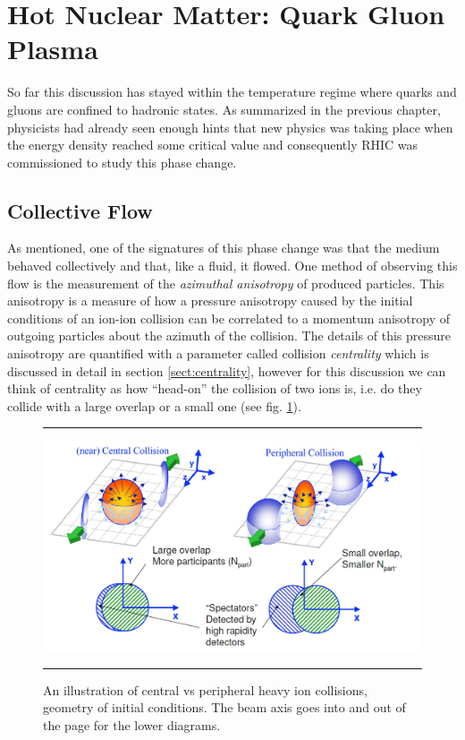 \section{Hot Nuclear Matter: Quark Gluon Plasma }
So far this discussion has stayed within the temperature regime where quarks and gluons are confined to hadronic states. As summarized in the previous chapter, physicists had already seen enough hints that new physics was taking place when the energy density reached some critical value and consequently RHIC was commissioned to study this phase change.

\subsection{Collective Flow}
As mentioned, one of the signatures of this phase change was that the medium behaved collectively and that, like a fluid, it flowed. One method of observing this flow is the measurement of the \textit{azimuthal anisotropy} of produced particles. This anisotropy is a measure of how a pressure anisotropy caused by the initial conditions of an ion-ion collision can be correlated to a momentum anisotropy of outgoing particles about the azimuth of the collision. The details of this pressure anisotropy are quantified with a parameter called collision \textit{centrality} which is discussed in detail in section \ref{sect:centrality}, however for this discussion we can think of centrality as how ``head-on'' the collision of two ions is, i.e. do they collide with a large overlap or a small one (see fig. \ref{fig:centvsperiph1}).

\begin{figure}[htbp]
\centering
\rule{35em}{0.5pt}
    \includegraphics[width=1\textwidth]{Figures/centralvsperipheral.jpg}    

	\caption[Central vs Peripheral collisions, geometry of initial conditions]{An illustration of central vs peripheral heavy ion collisions, geometry of initial conditions. The beam axis goes into and out of the page for the lower diagrams.}
\label{fig:centvsperiph1}
\rule{35em}{0.5pt}
\end{figure}


